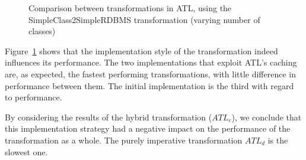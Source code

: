 \documentclass[12pt]{elsarticle}
\begin{document}
\begin{figure}[thb]
\centering
{}
\caption{Comparison between transformations in ATL, using the
SimpleClass2SimpleRDBMS transformation (varying number of
classes)\label{fig:atl_attributes_compared}}
\end{figure}

Figure~\ref{fig:atl_attributes_compared} shows that the implementation style of the
transformation indeed influences its performance. The two implementations that
exploit ATL's caching are, as expected, the fastest performing transformations, with little difference in
performance between them. The initial implementation is the third with regard to
performance.

By considering the results of the hybrid transformation ($ATL_c$), we
conclude that this implementation strategy had a negative impact on the
performance of the transformation as a whole. The purely imperative
transformation $ATL_d$ is the slowest one.\\
\end{document}
